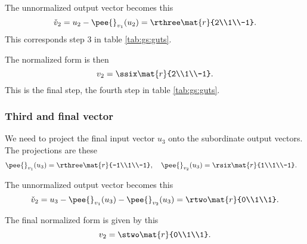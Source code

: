 The unnormalized output vector becomes this
\begin{equation}
  \check{v}_{2}= u_{2} - \pee{}_{v_{1}}(u_{2}) = \rthree \mat{r}{2\\1\\-1}.
\end{equation}
This corresponds step 3 in table \eqref{tab:gs:guts}.

The normalized form is then
\begin{equation}
  v_{2} = \ssix \mat{r}{2\\1\\-1}.
\end{equation}
This is the final step, the fourth step in table \eqref{tab:gs:guts}.

\subsubsection{Third and final vector}
We need to project the final input vector $u_{3}$ onto the subordinate output vectors. The projections are these
\begin{equation}
  \begin{split}
    \pee{}_{v_{1}}(u_{3}) = \rthree \mat{r}{-1\\1\\-1}, \quad \pee{}_{v_{2}}(u_{3}) &= \rsix   \mat{r}{1\\1\\-1}.
  \end{split}
\end{equation}

The unnormalized output vector becomes this
\begin{equation}
  \check{v}_{2}= u_{3} - \pee{}_{v_{1}}(u_{3}) - \pee{}_{v_{2}}(u_{3}) = \rtwo \mat{r}{0\\1\\1}.
\end{equation}

The final normalized form is given by this
\begin{equation}
  v_{2} = \stwo \mat{r}{0\\1\\1}.
\end{equation}

